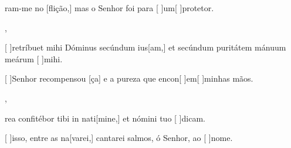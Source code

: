 {    {\item {}ram-me no [flição,] mas o Senhor foi para [ ]{um}[ ]{pro}tetor.~\Antiphona},
  {\item {}[ ]{re}tríbuet mihi Dóminus secúndum ius[am,] et secúndum puritátem mánuum meárum [ ]{mi}hi.~\Antiphona}%
    {\item {}[ ]{Se}nhor recompensou [ça] e a pureza que encon[ ]{em}[ ]{mi}nhas mãos.~\Antiphona},
  {\item {}rea confitébor tibi in nati[mine,] et nómini tuo [ ]{di}cam.~\Antiphona}%
    {\item {}[ ]{is}so, entre as na[varei,] cantarei salmos, ó Senhor, ao [ ]{no}me.~\Antiphona}
}